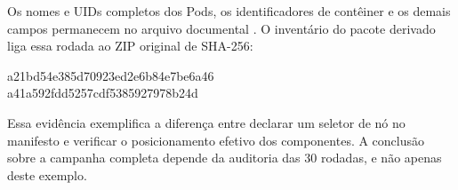 Os nomes e UIDs completos dos Pods, os identificadores de contêiner e os demais campos permanecem no arquivo documental . O inventário do pacote derivado liga essa rodada ao ZIP original de SHA-256:
\begin{center}\ttfamily\small
a21bd54e385d70923ed2e6b84e7be6a46\\
a41a592fdd5257cdf5385927978b24d
\end{center}
Essa evidência exemplifica a diferença entre declarar um seletor de nó no manifesto e verificar o posicionamento efetivo dos componentes. A conclusão sobre a campanha completa depende da auditoria das 30 rodadas, e não apenas deste exemplo.
